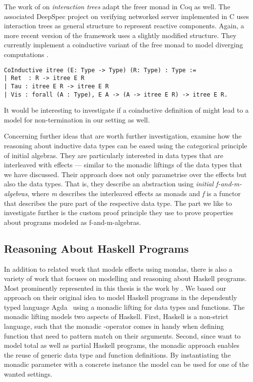 The work of \citet{koh2019interaction} on \emph{interaction trees}
adapt the freer monad in Coq as well.
The associated DeepSpec project on verifying networked server
implemented in C uses interaction trees as general structure to
represent reactive components.
Again,  a more recent version of the framework uses a slightly
modified structure.
They currently implement a coinductive variant of the free monad to
model diverging computations \citep{xia2019interaction}.

\begin{verbatim}
CoInductive itree (E: Type -> Type) (R: Type) : Type :=
| Ret  : R -> itree E R
| Tau : itree E R -> itree E R
| Vis : forall (A : Type), E A -> (A -> itree E R) -> itree E R.
\end{verbatim}

It would be interesting to investigate if a coinductive definition of
 might lead to a model for non-termination in our setting
as well.

Concerning further ideas that are worth further investigation,
\citet{atkey2015interleaving} examine how the reasoning about
inductive data types can be eased using the categorical principle of
initial algebras.
They are particularly interested in data types that are interleaved
with effects --- similar to the monadic liftings of the data types
that we have discussed.
Their approach does not only parametrise over the effects but also the
data types.
That is, they describe an abstraction using \emph{initial
  f-and-m-algebras}, where \emph{m} describes the interleaved
effects as monads and \emph{f} is a functor that describes the pure
part of the respective data type.
The part we like to investigate further is the custom proof principle
they use to prove properties about programs modeled as
f-and-m-algebras.


\subsection{Reasoning About Haskell Programs}

In addition to related work that models effects using mondas, there is
also a variety of work that focuses on modelling and reasoning about
Haskell programs.
Most prominently represented in this thesis is the work by
\citet{abel2005verifying}.
We based our approach on their original idea to model Haskell programs
in the dependently typed language Agda~\citep{norell2008dependently}
using a monadic lifting for data types and functions.
The monadic lifting models two aspects of Haskell.
First, Haskell is a non-strict language, such that the monadic
\hinl{>>=}-operator comes in handy when defining function that need to
pattern match on their arguments.
Second, since \citeauthor{abel2005verifying} want to model total as well as
partial Haskell programs, the monadic approach enables the reuse of
generic data type and function definitions.
By instantiating the monadic parameter with a concrete instance the
model can be used for one of the wanted settings.

